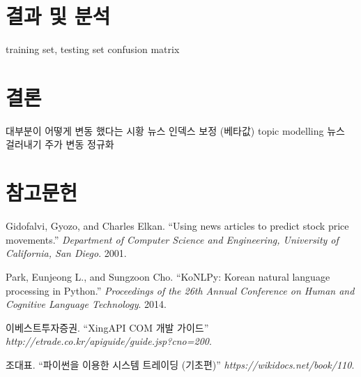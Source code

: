 \documentclass[a4paper,10pt]{article}
\begin{document}
\section{결과 및 분석}

training set, testing set
confusion matrix

\section{결론}

대부분이 어떻게 변동 했다는 시황 뉴스
인덱스 보정 (베타값)
topic modelling 뉴스 걸러내기
주가 변동 정규화

\section*{참고문헌}

\begin{enumerate}[ {[}1{]} ]
\item Gidofalvi, Gyozo, and Charles Elkan. ``Using news articles to predict stock price movements.'' \textit{Department of Computer Science and Engineering, University of California, San Diego}. 2001.
\item Park, Eunjeong L., and Sungzoon Cho. ``KoNLPy: Korean natural language processing in Python.'' \textit{Proceedings of the 26th Annual Conference on Human and Cognitive Language Technology}. 2014.
\item 이베스트투자증권. ``XingAPI COM 개발 가이드'' \textit{http://etrade.co.kr/apiguide/guide.jsp?cno=200}.
\item 조대표. ``파이썬을 이용한 시스템 트레이딩 (기초편)'' \textit{https://wikidocs.net/book/110}.
\end{enumerate}
\end{document}
